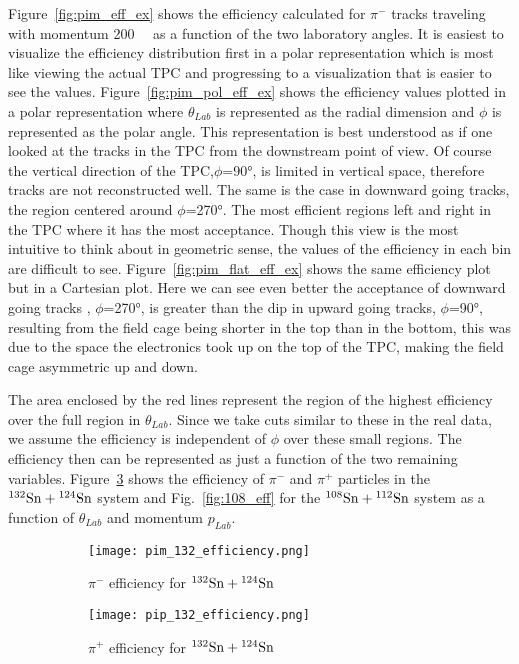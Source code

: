 Figure~\ref{fig:pim_eff_ex} shows the efficiency calculated for $\pi^-$ tracks traveling with momentum \SI{200}{\mega\eVperc} as a function of the two laboratory angles. It is easiest to visualize the efficiency distribution first in a polar representation which is most like viewing the actual TPC and progressing to a visualization that is easier to see the values. Figure~\ref{fig:pim_pol_eff_ex} shows the efficiency values plotted in a polar representation where $\theta_{Lab}$ is represented as the radial dimension and $\phi$ is represented as the polar angle. This representation is best understood as if one looked at the tracks in the TPC from the downstream point of view. Of course the vertical direction of the TPC,$\phi$=\ang{90}, is limited in vertical space, therefore tracks are not reconstructed well. The same is the case in downward going tracks, the region centered around $\phi$=\ang{270}. The most efficient regions left and right in the TPC where it has the most acceptance. Though this view is the most intuitive to think about in geometric sense, the values of the efficiency in each bin are difficult to see. Figure~\ref{fig:pim_flat_eff_ex} shows the same efficiency plot but in a Cartesian plot. Here we can see even better the acceptance of downward going tracks , $\phi$=\ang{270}, is greater than the dip in upward going tracks, $\phi$=\ang{90}, resulting from the field cage being shorter in the top than in the bottom, this was due to the space the electronics took up on the top of the TPC, making the field cage asymmetric up and down. 

The area enclosed by the red lines represent the region of the highest efficiency over the full region in $\theta_{Lab}$.  Since we take cuts similar to these in the real data, we assume the efficiency is independent of $\phi$ over these small regions. The efficiency then can be represented as just a function of the two remaining variables. Figure~\ref{fig:132_eff} shows the efficiency of $\pi^-$ and $\pi^+$ particles in the ${}^{132}\mathrm{Sn} + {}^{124}\mathrm{Sn}$ system and Fig.~\ref{fig:108_eff} for the ${}^{108}\mathrm{Sn} + {}^{112}\mathrm{Sn}$ system as a function of $\theta_{Lab}$ and momentum $p_{Lab}$. 



\begin{figure}[!htb]
    \centering
    \begin{subfigure}[t]{0.49\textwidth}
        \centering
        \texttt{[image: pim\_132\_efficiency.png]}
        \caption{$\pi^-$ efficiency for ${}^{132}\mathrm{Sn} + {}^{124}\mathrm{Sn}$} \label{fig:pim_132_eff}
    \end{subfigure}
    \hfill
    \begin{subfigure}[t]{.49\textwidth}
        \centering
        \texttt{[image: pip\_132\_efficiency.png]} 
        \caption{$\pi^+$ efficiency for ${}^{132}\mathrm{Sn} + {}^{124}\mathrm{Sn}$} \label{fig:pip_132_eff}
    \end{subfigure}
  
    \caption{ }
\label{fig:132_eff}
\end{figure}



